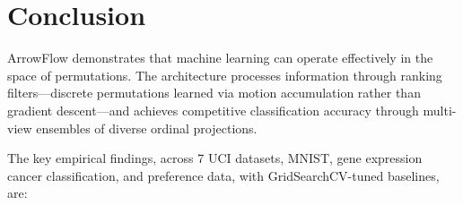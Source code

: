 \documentclass[12pt]{article}
\begin{document}
\section{Conclusion}
\label{sec:conclusion}

ArrowFlow demonstrates that machine learning can operate effectively in the space of permutations. The architecture processes information through ranking filters---discrete permutations learned via motion accumulation rather than gradient descent---and achieves competitive classification accuracy through multi-view ensembles of diverse ordinal projections.

The key empirical findings, across 7 UCI datasets, MNIST, gene expression cancer classification, and preference data, with GridSearchCV-tuned baselines, are:
\end{document}
